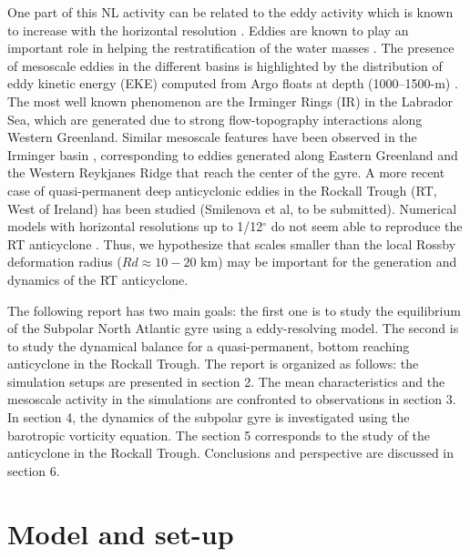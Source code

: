 \documentclass[11pt,a4paper]{article}
\begin{document}
One part of this NL activity can be related to the eddy activity which is known to increase with the horizontal resolution \citep{marzocchi2015}. Eddies are known to play an important role in helping the restratification of the water masses \citep{couvelard2015}. The presence of mesoscale eddies in the different basins is highlighted by the distribution of eddy kinetic energy (EKE) computed from Argo floats at depth (1000--1500-m) \citep{fischer2018}. The most well known phenomenon are the Irminger Rings (IR) in the Labrador Sea, which are generated due to strong flow-topography interactions along Western Greenland. Similar mesoscale features have been observed  in the Irminger basin \citep{fan2013}, corresponding to eddies generated along Eastern Greenland and the Western Reykjanes Ridge that reach the center of the gyre. A more recent case of quasi-permanent deep anticyclonic eddies in the Rockall Trough (RT, West of Ireland) has been studied (Smilenova et al, to be submitted). Numerical models with horizontal resolutions up to 1/12$^{\circ}$ do not seem able to reproduce the RT anticyclone \cite{treguier2005}. Thus, we hypothesize that scales smaller than the local Rossby deformation radius ($Rd \approx 10-20$ km) may be important for the generation and dynamics of the RT anticyclone. 

The following report has two main goals: the first one is to study the equilibrium of the Subpolar North Atlantic gyre using a eddy-resolving model. The second is to  study the dynamical balance for a quasi-permanent, bottom reaching anticyclone in the Rockall Trough. The report is organized as follows: the simulation setups are presented in section 2. The mean characteristics and the mesoscale activity in the simulations are confronted to observations in section 3. In section 4, the dynamics of the subpolar gyre is investigated using the barotropic vorticity equation. The section 5 corresponds to the study of the anticyclone in the Rockall Trough. Conclusions and perspective are discussed in section 6.



\section{Model and set-up}
\end{document}
